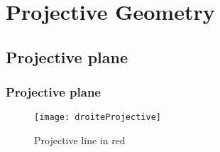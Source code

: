 \section{Projective Geometry}

\subsection{Projective plane}

\begin{frame}[t]
    \frametitle{Projective plane}
        \begin{figure}[t]
            \centering
            \texttt{[image: droiteProjective]}
            \caption{Projective line in red}
            \label{fig:droiteProjective}
        \end{figure}
\end{frame}


